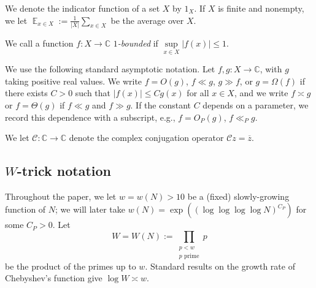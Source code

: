 \documentclass[11pt]{amsart}
\theoremstyle{definition}
\DeclareMathOperator*{\E}{\mathbb{E}}
\newcommand{\C}{{\mathbb C}}
\newcommand{\CC}{{\mathcal C}}
\begin{document}
We denote the indicator function of a set $X$ by $1_X$.  If $X$ is finite and nonempty, we let $\E_{x\in X} := \frac{1}{|X|}\sum_{x\in X}$ be the average over $X$.  



We call a function $f:X\to \C$ \textit{$1$-bounded} if $\sup\limits_{x\in X}|f(x)|\leq 1$. 

We use the following standard asymptotic notation. Let $f,g: X\to\C$, with $g$ taking positive real values.  We write $f=O(g)$, $f\ll g$, $g\gg f$, or $g = \Omega(f)$ if there exists $C>0$ such that $|f(x)|\leq C g(x)$ for all $x\in X$, and we write $f\asymp g$ or $f = \Theta(g)$ if $f\ll g$ and $f\gg g$.  If the constant $C$ depends on a parameter, we record this dependence with a subscript, e.g., $f=O_P(g)$, $f \ll_P g$. 

We let $\CC: \C \to \C$ denote the complex conjugation operator $\CC z=\overline{z}$.




\subsection{$W$-trick notation}
Throughout the paper, we let $w=w(N)>10$ be a (fixed) slowly-growing function of $N$; we will later take $w(N)=\exp((\log\log\log\log N)^{C_P})$ for some $C_P>0$.  Let
$$W =W(N):= \prod_{\substack{p < w \\ p \text{ prime}}} p$$
be the product of the primes up to $w$. Standard results on the growth rate of Chebyshev's function give $\log W \asymp w$.
\end{document}

